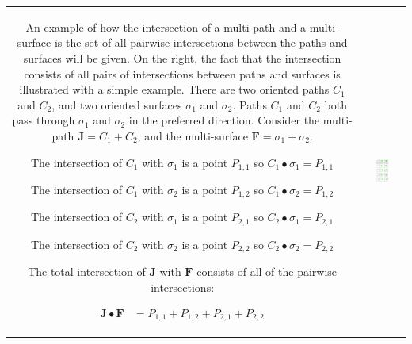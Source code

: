 \documentclass{book}
\begin{document}
\begin{center}
\begin{tabular}{cc}
\parbox{0.5\textwidth}{
An example of how the intersection of a multi-path and a multi-surface is the set of all pairwise intersections between the paths and surfaces will be given. On the right, the fact that the intersection consists of all pairs of intersections between paths and surfaces is illustrated with a simple example. There are two oriented paths \(C_1\) and \(C_2\), and two oriented surfaces \(\sigma_1\) and \(\sigma_2\). Paths \(C_1\) and \(C_2\) both pass through \(\sigma_1\) and \(\sigma_2\) in the preferred direction. Consider the multi-path \(\mathbf{J} = C_1 + C_2\), and the multi-surface \(\mathbf{F} = \sigma_1 + \sigma_2\). 

The intersection of \(C_1\) with \(\sigma_1\) is a point \(P_{1,1}\) so \\ \(C_1 \bullet \sigma_1 = P_{1,1}\)  

The intersection of \(C_1\) with \(\sigma_2\) is a point \(P_{1,2}\) so \\ \(C_1 \bullet \sigma_2 = P_{1,2}\)  

The intersection of \(C_2\) with \(\sigma_1\) is a point \(P_{2,1}\) so \\ \(C_2 \bullet \sigma_1 = P_{2,1}\)  

The intersection of \(C_2\) with \(\sigma_2\) is a point \(P_{2,2}\) so \\ \(C_2 \bullet \sigma_2 = P_{2,2}\)  

The total intersection of \(\mathbf{J}\) with \(\mathbf{F}\) consists of all of the pairwise intersections:

\begin{align*}
\mathbf{J} \bullet \mathbf{F} & = P_{1,1} + P_{1,2} + P_{2,1} + P_{2,2} 
\end{align*}
} & \parbox{0.4\textwidth}{
\includegraphics[width = 0.4\textwidth]{Intersections/Path-surface_intersections/path_surface_intersection_distributive_law}
}
\end{tabular}
\end{center}
\end{document}
